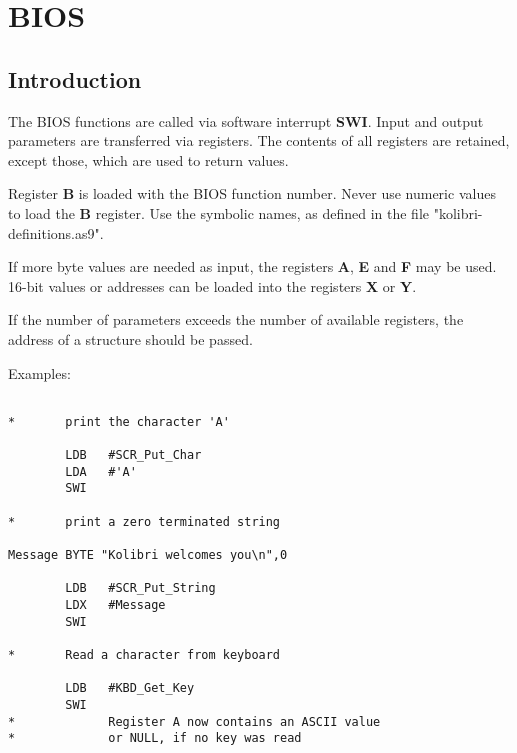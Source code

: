 \chapter{BIOS}

\section{Introduction}

The BIOS functions are called via software interrupt {\bf SWI}.
Input and output parameters are transferred via registers.
The contents of all registers are retained, except those,
which are used to return values.

Register {\bf B} is loaded with the BIOS function number.
Never use numeric values to load the {\bf B} register.
Use the symbolic names, as defined in the file
"kolibri-definitions.as9".

If more byte values are needed as input, the registers
{\bf A}, {\bf E} and {\bf F} may be used.
16-bit values or addresses can be loaded into the registers
{\bf X} or {\bf Y}.

If the number of parameters exceeds the number of available
registers, the address of a structure should be passed.

Examples:
\begin{verbatim}

*       print the character 'A'

        LDB   #SCR_Put_Char
        LDA   #'A'
        SWI

*       print a zero terminated string

Message BYTE "Kolibri welcomes you\n",0

        LDB   #SCR_Put_String
        LDX   #Message
        SWI

*       Read a character from keyboard

        LDB   #KBD_Get_Key
        SWI
*             Register A now contains an ASCII value
*             or NULL, if no key was read

\end{verbatim}

